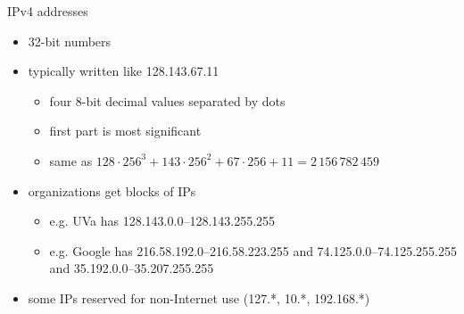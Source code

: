\begin{frame}{IPv4 addresses}
    \begin{itemize}
    \item 32-bit numbers
    \item typically written like 128.143.67.11
        \begin{itemize}
        \item four 8-bit decimal values separated by dots
        \item first part is most significant
        \item same as $128\cdot 256^3+143\cdot 256^2 + 67\cdot256 + 11 = 2\,156\,782\,459$
        \end{itemize}
    \vspace{.5cm}
    \item organizations get blocks of IPs
    \begin{itemize}
        \item e.g. UVa has 128.143.0.0--128.143.255.255
        \item e.g. Google has 216.58.192.0--216.58.223.255 and 74.125.0.0--74.125.255.255 and 35.192.0.0--35.207.255.255
    \end{itemize}
    \item some IPs reserved for non-Internet use (127.*, 10.*, 192.168.*)
    \end{itemize}
\end{frame}

